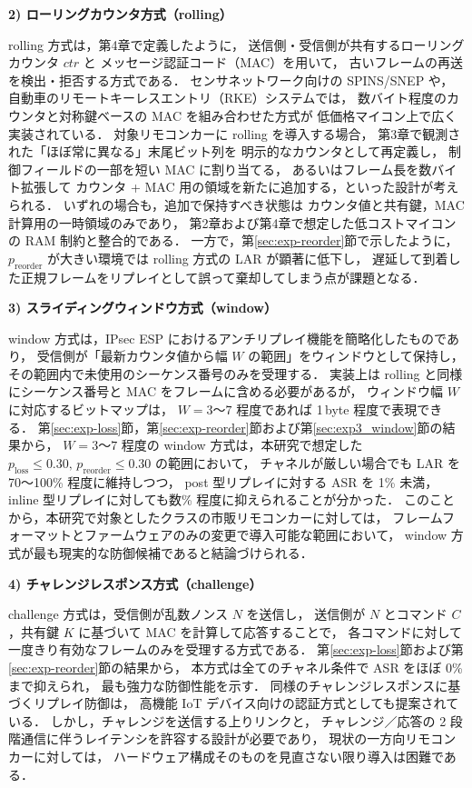\documentclass[twocolumn,10pt,a4paper]{jsarticle}
\begin{document}
\vspace{1em}
\noindent\textbf{2) ローリングカウンタ方式（rolling）}\par
rolling 方式は，第4章で定義したように，
送信側・受信側が共有するローリングカウンタ $ctr$ と
メッセージ認証コード（MAC）を用いて，
古いフレームの再送を検出・拒否する方式である．
センサネットワーク向けの SPINS/SNEP\cite{PerrigSPINS} や，
自動車のリモートキーレスエントリ（RKE）システム\cite{Garcia2016RKE,Francillon2011PKES}では，
数バイト程度のカウンタと対称鍵ベースの MAC を組み合わせた方式が
低価格マイコン上で広く実装されている．
対象リモコンカーに rolling を導入する場合，
第3章で観測された「ほぼ常に異なる」末尾ビット列を
明示的なカウンタとして再定義し，
制御フィールドの一部を短い MAC に割り当てる，
あるいはフレーム長を数バイト拡張して
カウンタ + MAC 用の領域を新たに追加する，といった設計が考えられる．
いずれの場合も，追加で保持すべき状態は
カウンタ値と共有鍵，MAC 計算用の一時領域のみであり，
第2章および第4章で想定した低コストマイコンの RAM 制約と整合的である．
一方で，第\ref{sec:exp-reorder}節で示したように，
$p_{\mathrm{reorder}}$ が大きい環境では rolling 方式の LAR が顕著に低下し，
遅延して到着した正規フレームをリプレイとして誤って棄却してしまう点が課題となる．

\vspace{1em}
\noindent\textbf{3) スライディングウィンドウ方式（window）}\par
window 方式は，IPsec ESP におけるアンチリプレイ機能\cite{rfc4303,rfc6479}を簡略化したものであり，
受信側が「最新カウンタ値から幅 $W$ の範囲」をウィンドウとして保持し，
その範囲内で未使用のシーケンス番号のみを受理する．
実装上は rolling と同様にシーケンス番号と MAC をフレームに含める必要があるが，
ウィンドウ幅 $W$ に対応するビットマップは，
$W=3$～$7$ 程度であれば 1\,byte 程度で表現できる．
第\ref{sec:exp-loss}節，第\ref{sec:exp-reorder}節および第\ref{sec:exp3_window}節の結果から，
$W=3$～$7$ 程度の window 方式は，本研究で想定した
$p_{\mathrm{loss}} \leq 0.30,\, p_{\mathrm{reorder}} \leq 0.30$ の範囲において，
チャネルが厳しい場合でも LAR を 70～100\% 程度に維持しつつ，
post 型リプレイに対する ASR を 1\% 未満，
inline 型リプレイに対しても数\% 程度に抑えられることが分かった．
このことから，本研究で対象としたクラスの市販リモコンカーに対しては，
フレームフォーマットとファームウェアのみの変更で導入可能な範囲において，
window 方式が最も現実的な防御候補であると結論づけられる．

\vspace{1em}
\noindent\textbf{4) チャレンジレスポンス方式（challenge）}\par
challenge 方式は，受信側が乱数ノンス $N$ を送信し，
送信側が $N$ とコマンド $C$，共有鍵 $K$ に基づいて MAC を計算して応答することで，
各コマンドに対して一度きり有効なフレームのみを受理する方式である\cite{PerrigSPINS}．
第\ref{sec:exp-loss}節および第\ref{sec:exp-reorder}節の結果から，
本方式は全てのチャネル条件で ASR をほぼ 0\% まで抑えられ，
最も強力な防御性能を示す．
同様のチャレンジレスポンスに基づくリプレイ防御は，
高機能 IoT デバイス向けの認証方式としても提案されている\cite{Nain2017,Feng2017}．
しかし，チャレンジを送信する上りリンクと，
チャレンジ／応答の 2 段階通信に伴うレイテンシを許容する設計が必要であり，
現状の一方向リモコンカーに対しては，
ハードウェア構成そのものを見直さない限り導入は困難である．
\end{document}
